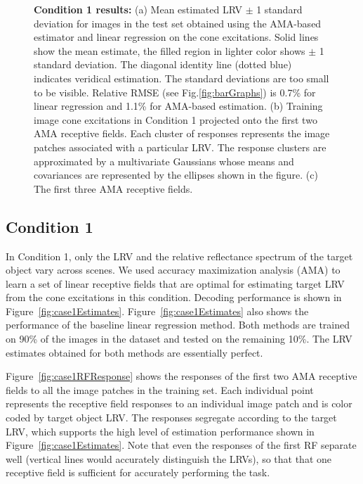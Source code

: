 \documentclass{jov}
\begin{document}
\begin{figure}
\begin{subfigure}[b]{0.32 \textwidth}
	\label{fig:case1RFs}
    \end{subfigure}   
    \caption{{\bf Condition 1 results:} (a) Mean estimated LRV $\pm$ 1 standard deviation for images in the test set obtained using the AMA-based estimator and linear regression on the cone excitations. Solid lines show the mean estimate, the filled region in lighter color shows $\pm$ 1 standard deviation. The diagonal identity line (dotted blue) indicates veridical estimation. The standard deviations are too small to be visible. Relative RMSE (see Fig.\ref{fig:barGraphs}) is 0.7\% for linear regression and 1.1\%  for AMA-based estimation. (b) Training image cone excitations in Condition 1 projected onto the first two AMA receptive fields. Each cluster of responses represents the image patches associated with a particular LRV. The response clusters are approximated by a multivariate Gaussians whose means and covariances are represented by the ellipses shown in the figure. (c) The first three AMA receptive fields.}
\label{fig:Condition1}
\end{figure}

\subsection{Condition 1}
In Condition 1, only the LRV and the relative reflectance spectrum of the target object vary across scenes.
We used accuracy maximization analysis (AMA) to learn a set of linear receptive fields that are optimal for estimating target LRV from the cone excitations in this condition. 
Decoding performance is shown in Figure~\ref{fig:case1Estimates}. 
Figure~\ref{fig:case1Estimates} also shows the performance of the baseline linear regression method. 
Both methods are trained on 90\% of the images in the dataset and tested on the remaining 10\%.
The LRV estimates obtained for both methods are essentially perfect.

Figure~\ref{fig:case1RFResponse} shows the responses of the first two AMA receptive fields to all the image patches in the training set.
Each individual point represents the receptive field responses to an individual image patch and
is color coded by target object LRV.
The responses segregate according to the target LRV, which supports the high level 
of estimation performance shown in Figure~\ref{fig:case1Estimates}.
Note that even the responses of the first RF separate well (vertical lines would accurately
distinguish the LRVs), so that that one receptive field is sufficient for accurately performing the task.
\end{document}
